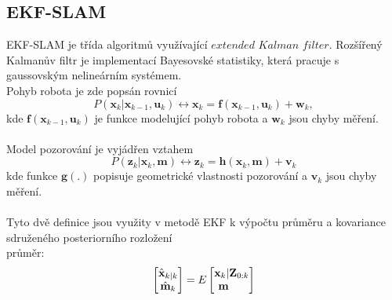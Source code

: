 \documentclass[12pt]{article}
\begin{document}
\subsection{EKF-SLAM}
EKF-SLAM je třída algoritmů využívající $extended$ $Kalman$ $filter$. Rozšířený Kalmanův filtr je implementací Bayesovské statistiky, která pracuje s gaussovským nelineárním systémem. \\
Pohyb robota je zde popsán rovnicí
\begin{equation}
	P(\textbf{x}_k|\textbf{x}_{k-1},\textbf{u}_k)\leftrightarrow \textbf{x}_k=\textbf{f}(\textbf{x}_{k-1},\textbf{u}_k)+\textbf{w}_k,
\end{equation} 
kde $\textbf{f}(\textbf{x}_{k-1},\textbf{u}_k)$ je funkce modelující pohyb robota a $\textbf{w}_k$ jsou chyby měření.\\
\\
Model pozorování je vyjádřen vztahem
\begin{equation}
	P(\textbf{z}_k|\textbf{x}_k,\textbf{m})\leftrightarrow \textbf{z}_k=\textbf{h}(\textbf{x}_k,\textbf{m})+\textbf{v}_k
\end{equation}
kde funkce $\textbf{g}(.)$ popisuje geometrické vlastnosti pozorování a $\textbf{v}_k$ jsou chyby měření.\\
\\
Tyto dvě definice jsou využity v metodě EKF k výpočtu průměru a kovariance sdruženého posteriorního rozložení\\
\indent průměr:
\begin{equation}
	\begin{bmatrix}
	\hat{\textbf{x}}_{k|k}\\\hat{\textbf{m}}_k
	\end{bmatrix}=E
	\begin{bmatrix}
	\textbf{x}_k |\textbf{Z}_{0:k}\\\textbf{m}\indent
	\end{bmatrix}
\end{equation}
\end{document}
